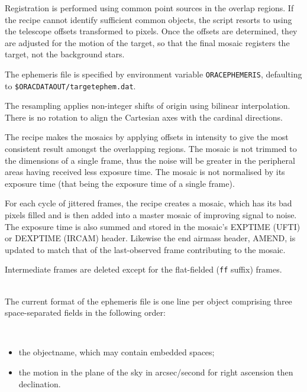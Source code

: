 \documentclass[twoside,11pt]{article}
\renewcommand{\_}{\texttt{\symbol{95}}}
\newcommand{\sstdiytopic}[2]{\goodbreak \item[{\hspace{-0.35em}#1\hspace{-0.35em}:}] \mbox{} \\[1.3ex] #2}
\newcommand{\ssthitemlist}[1]{
  \mbox{} \\
  \vspace{-3.5ex}
  \begin{itemize}
     #1
  \end{itemize}
}
\newcommand{\sstitem}{\item}
\newcommand{\sstdiytopic}[2]{\item[{#1}:]
      \begin{description}
         #2
      \end{description}
      \\
   }
\newcommand{\ssthitemlist}[1]{
      \begin{itemize}
         #1
      \end{itemize}
      \\
   }
\begin{document}
{{{         \sstitem
         Registration is performed using common point sources in the
         overlap regions.  If the recipe cannot identify sufficient common
         objects, the script resorts to using the telescope offsets
         transformed to pixels.  Once the offsets are determined, they
         are adjusted for the motion of the target, so that the final
         mosaic registers the target, not the background stars.

         \sstitem
         The ephemeris file is specified by environment variable
         {\tt{ORAC\_EPHEMERIS}}, defaulting to {\tt\$ORAC\_DATA\_OUT/target\_ephem.dat}.

         \sstitem
         The resampling applies non-integer shifts of origin using
         bilinear interpolation.  There is no rotation to align the
         Cartesian axes with the cardinal directions.

         \sstitem
         The recipe makes the mosaics by applying offsets in intensity
         to give the most consistent result amongst the overlapping regions.
         The mosaic is not trimmed to the dimensions of a single frame, thus
         the noise will be greater in the peripheral areas having received
         less exposure time.  The mosaic is not normalised by its exposure
         time (that being the exposure time of a single frame).

         \sstitem
         For each cycle of jittered frames, the recipe creates a mosaic,
         which has its bad pixels filled and is then added into a master
         mosaic of improving signal to noise.  The exposure time is also
         summed and stored in the mosaic's EXP\_TIME (UFTI) or DEXPTIME
         (IRCAM) header.  Likewise the end airmass header, AMEND, is updated
         to match that of the last-observed frame contributing to the mosaic.

         \sstitem
         Intermediate frames are deleted except for the flat-fielded ({\tt\_ff}
         suffix) frames.
      }
   }
   \label{ephem_format}
   \sstdiytopic{
      Ephemeris-file Format
   }{
      The current format of the ephemeris file is one line per object
      comprising three space-separated fields in the following order:
      \ssthitemlist{

         \sstitem
           the objectname, which may contain embedded spaces;

         \sstitem
           the motion in the plane of the sky in arcsec/second for right
           ascension then declination.

}}}
\end{document}
